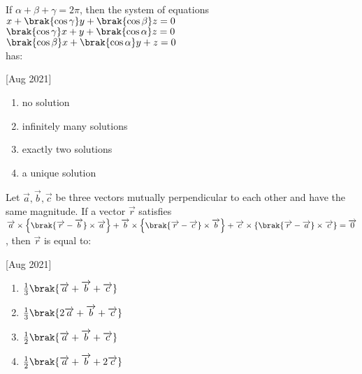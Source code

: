 
\iffalse
	\title{2021}
	\author{AI24BTECH11003}
	\section{mcq-single}
\fi

    \item If $\alpha+\beta+\gamma=2\pi$, then the system of equations\\
    $x+\brak{\cos\gamma}y+\brak{\cos\beta}z=0$\\
    $\brak{\cos\gamma}x+y+\brak{\cos\alpha}z=0$\\
    $\brak{\cos\beta}x+\brak{\cos\alpha}y+z=0$\\
    has:
    
    \hfill[Aug 2021]

        \begin{multicols}{2}
            \begin{enumerate}
                \item no solution
                \item infinitely many solutions
                \item exactly two solutions
                \item a unique solution
            \end{enumerate}
        \end{multicols}

    \item Let $\overrightarrow{a},\overrightarrow{b},\overrightarrow{c}$ be three vectors mutually perpendicular to each other and have the same magnitude. If a vector $\overrightarrow{r}$ satisfies 
    $\overrightarrow{a}\times\left\{ \brak{\overrightarrow{r}-\overrightarrow{b}}\times\overrightarrow{a} \right\} + \overrightarrow{b}\times\left\{ \brak{\overrightarrow{r}-\overrightarrow{c}}\times\overrightarrow{b} \right\} + \overrightarrow{c}\times\left\{ \brak{\overrightarrow{r}-\overrightarrow{a}}\times\overrightarrow{c} \right\} = \overrightarrow{0}$, then $\overrightarrow{r}$ is equal to:
    
    \hfill[Aug 2021]

		\begin{multicols}{4}
			\begin{enumerate}
				\item $\frac{1}{3}\brak{\overrightarrow{a}+\overrightarrow{b}+\overrightarrow{c}}$
				\item $\frac{1}{3}\brak{2\overrightarrow{a}+\overrightarrow{b}+\overrightarrow{c}}$
				\item $\frac{1}{2}\brak{\overrightarrow{a}+\overrightarrow{b}+\overrightarrow{c}}$
				\item $\frac{1}{2}\brak{\overrightarrow{a}+\overrightarrow{b}+2\overrightarrow{c}}$
			\end{enumerate}
		\end{multicols}

